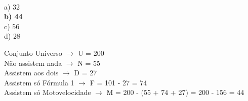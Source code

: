 \documentclass[12pt,a4paper,draft]{article}
\begin{document}
	\vspace{0.5cm}\\
	a) 32\\
	\textbf{b) 44}\\
	c) 56\\
	d) 28\\
	\vspace{0.5cm}
	\begin{center}
	Conjunto Universo $\rightarrow$ U = 200\\
	Não assistem nada $\rightarrow$ N = 55\\
	Assistem aos dois $\rightarrow$ D = 27\\
	Assistem só Fórmula 1 $\rightarrow$ F = 101 - 27 = 74\\
	Assistem só Motovelocidade $\rightarrow$ M = 200 - (55 + 74 + 27) = 200 - 156 = 44
	\end{center}
\end{document}

